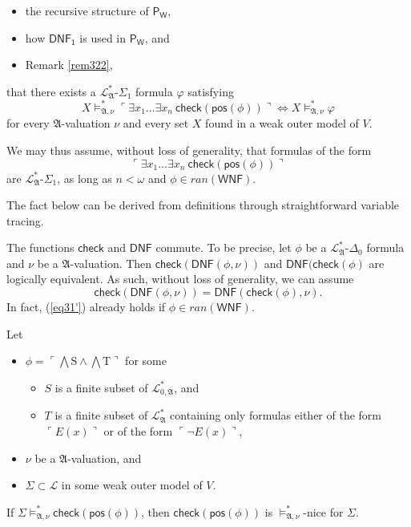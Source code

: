 \documentclass[12pt]{article}
\numberwithin{equation}{section}
\begin{document}
\begin{rem}
\begin{itemize}
    \item the recursive structure of $\mathsf{P_W}$, 
    \item how $\mathsf{DNF_1}$ is used in $\mathsf{P_W}$, and
    \item Remark \ref{rem322}, 
\end{itemize}
that there exists a $\mathcal{L}^{*}_{\mathfrak{A}}$-$\Sigma_1$ formula $\varphi$ satisfying $$X \models^*_{\mathfrak{A}, \nu} \ulcorner \exists x_1 \dots \exists x_n \ \mathsf{check}(\mathsf{pos}(\phi)) \urcorner \iff X \models^*_{\mathfrak{A}, \nu} \varphi$$ for every $\mathfrak{A}$-valuation $\nu$ and every set $X$ found in a weak outer model of $V$.

We may thus assume, without loss of generality, that formulas of the form $$\ulcorner \exists x_1 \dots \exists x_n \ \mathsf{check}(\mathsf{pos}(\phi)) \urcorner$$ are $\mathcal{L}^{*}_{\mathfrak{A}}$-$\Sigma_1$, as long as $n < \omega$ and $\phi \in ran(\mathsf{WNF})$.
\end{rem}

The fact below can be derived from definitions through straightforward variable tracing.

\begin{fact}\label{fact330}
The functions $\mathsf{check}$ and $\mathsf{DNF}$ commute. To be precise, let $\phi$ be a $\mathcal{L}^{*}_{\mathfrak{A}}$-$\Delta_0$ formula and $\nu$ be a $\mathfrak{A}$-valuation. Then $\mathsf{check}(\mathsf{DNF}(\phi, \nu))$ and $\mathsf{DNF}(\mathsf{check}(\phi)$ are logically equivalent. As such, without loss of generality, we can assume
\begin{equation}\label{eq31'}
    \mathsf{check}(\mathsf{DNF}(\phi, \nu)) = \mathsf{DNF}(\mathsf{check}(\phi), \nu) \text{.}
\end{equation}
In fact, (\ref{eq31'}) already holds if $\phi \in ran(\mathsf{WNF})$.
\end{fact}

\begin{lem}\label{postrue}
Let 
\begin{itemize}
    \item $\phi = \ulcorner \bigwedge \mathrm{S} \wedge \bigwedge \mathrm{T} \urcorner$ for some 
    \begin{itemize}[label=$\circ$]
        \item $S$ is a finite subset of $\mathcal{L}^{*}_{0, \mathfrak{A}}$, and
        \item $T$ is a finite subset of $\mathcal{L}^{*}_{\mathfrak{A}}$ containing only formulas either of the form $\ulcorner E(x) \urcorner$ or of the form $\ulcorner \neg E(x) \urcorner$,
    \end{itemize}
    \item $\nu$ be a $\mathfrak{A}$-valuation, and
    \item $\Sigma \subset \mathcal{L}$ in some weak outer model of $V$.
\end{itemize}
If $\Sigma \models^*_{\mathfrak{A}, \nu} \mathsf{check}(\mathsf{pos}(\phi))$, then $\mathsf{check}(\mathsf{pos}(\phi))$ is $\models^*_{\mathfrak{A}, \nu}$-nice for $\Sigma$.
\end{lem}
\end{document}
